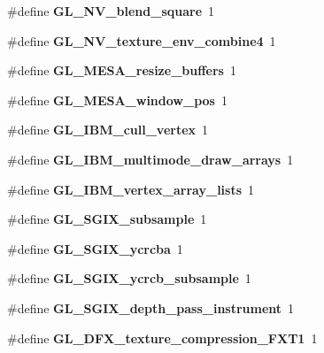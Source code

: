 \begin{DoxyCompactItemize}
\item 
\#define {\bfseries G\+L\+\_\+\+N\+V\+\_\+blend\+\_\+square}~1\label{_s_d_l__opengl_8h_a5dba9d942111a343621330604234ee4e}

\item 
\#define {\bfseries G\+L\+\_\+\+N\+V\+\_\+texture\+\_\+env\+\_\+combine4}~1\label{_s_d_l__opengl_8h_abb30e6b229ca83853dc4dfe85bad460c}

\item 
\#define {\bfseries G\+L\+\_\+\+M\+E\+S\+A\+\_\+resize\+\_\+buffers}~1\label{_s_d_l__opengl_8h_a971897a5a626e12c1fb5026d79a5ba4b}

\item 
\#define {\bfseries G\+L\+\_\+\+M\+E\+S\+A\+\_\+window\+\_\+pos}~1\label{_s_d_l__opengl_8h_ae08c370d8cee3c2f8d486a4f100673ac}

\item 
\#define {\bfseries G\+L\+\_\+\+I\+B\+M\+\_\+cull\+\_\+vertex}~1\label{_s_d_l__opengl_8h_a3a93a245950770cdf196c80e1cd157c1}

\item 
\#define {\bfseries G\+L\+\_\+\+I\+B\+M\+\_\+multimode\+\_\+draw\+\_\+arrays}~1\label{_s_d_l__opengl_8h_a54eb6d83c06bca0db5b6df3459cd58cb}

\item 
\#define {\bfseries G\+L\+\_\+\+I\+B\+M\+\_\+vertex\+\_\+array\+\_\+lists}~1\label{_s_d_l__opengl_8h_ad37efaae7ec42fa0dce5761e0b07a57f}

\item 
\#define {\bfseries G\+L\+\_\+\+S\+G\+I\+X\+\_\+subsample}~1\label{_s_d_l__opengl_8h_aa547dea5ff3e19d06ff0c513d1afb0ab}

\item 
\#define {\bfseries G\+L\+\_\+\+S\+G\+I\+X\+\_\+ycrcba}~1\label{_s_d_l__opengl_8h_a40d3cae64337f92284ab9d6e0b81415b}

\item 
\#define {\bfseries G\+L\+\_\+\+S\+G\+I\+X\+\_\+ycrcb\+\_\+subsample}~1\label{_s_d_l__opengl_8h_a9fcb7a8991877688bbc503ab2cd95038}

\item 
\#define {\bfseries G\+L\+\_\+\+S\+G\+I\+X\+\_\+depth\+\_\+pass\+\_\+instrument}~1\label{_s_d_l__opengl_8h_a99b013fb3f6b98e61514600a1ed53976}

\item 
\#define {\bfseries G\+L\+\_\+D\+F\+X\+\_\+texture\+\_\+compression\+\_\+\+F\+X\+T1}~1\label{_s_d_l__opengl_8h_a932133cb6adacda7d651bb222ed32f26}


\end{DoxyCompactItemize}
